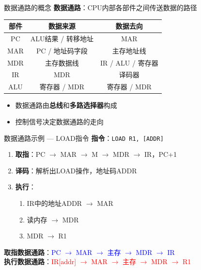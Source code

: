 \documentclass[10pt, aspectratio=169]{beamer}
\begin{document}
\begin{frame}{数据通路的概念}
    \textbf{数据通路}：CPU内部各部件之间传送数据的路径
    \vspace{0.3em}
    \begin{center}
        \begin{tabular}{|c|c|c|}
            \hline
            \textbf{部件} & \textbf{数据来源} & \textbf{数据去向} \\
            \hline
            PC  & ALU结果 / 转移地址 & MAR \\
            MAR & PC / 地址码字段 & 主存地址线 \\
            MDR & 主存数据线 & IR / ALU / 寄存器 \\
            IR  & MDR & 译码器 \\
            ALU & 寄存器 / MDR & 寄存器 / MDR \\
            \hline
        \end{tabular}
    \end{center}
    \vspace{0.3em}
    \begin{itemize}
        \item 数据通路由\textbf{总线}和\textbf{多路选择器}构成
        \item 控制信号决定数据通路的走向
    \end{itemize}
\end{frame}

\begin{frame}{数据通路示例 --- LOAD指令}
    \textbf{指令}：\texttt{LOAD R1, [ADDR]}
    \vspace{0.3em}
    \begin{enumerate}
        \item \textbf{取指}：PC $\rightarrow$ MAR $\rightarrow$ M $\rightarrow$ MDR $\rightarrow$ IR，PC+1
        \item \textbf{译码}：解析出LOAD操作，地址码ADDR
        \item \textbf{执行}：
            \begin{enumerate}
                \item IR中的地址ADDR $\rightarrow$ MAR
                \item 读内存 $\rightarrow$ MDR
                \item MDR $\rightarrow$ R1
            \end{enumerate}
    \end{enumerate}
    \vspace{0.3em}
    \begin{center}
        \textbf{取指数据通路}：\textcolor{blue}{PC $\rightarrow$ MAR $\rightarrow$ 主存 $\rightarrow$ MDR $\rightarrow$ IR} \\
        \textbf{执行数据通路}：\textcolor{red}{IR[addr] $\rightarrow$ MAR $\rightarrow$ 主存 $\rightarrow$ MDR $\rightarrow$ R1}
    \end{center}
\end{frame}
\end{document}
